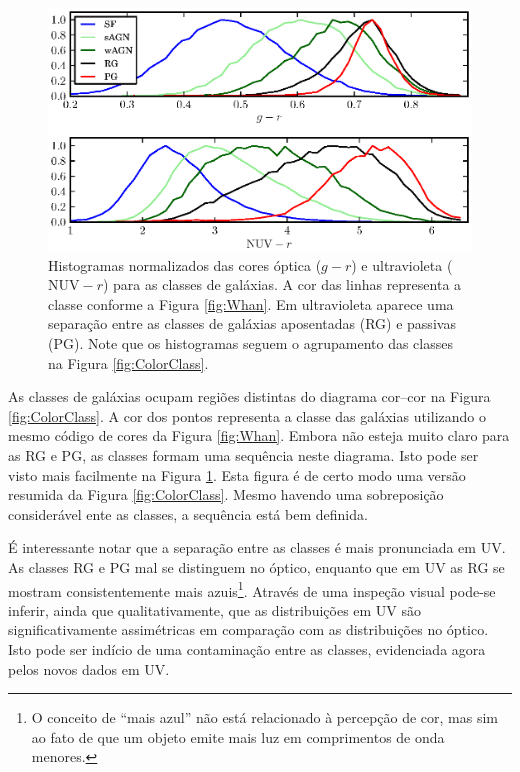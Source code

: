 \begin{figure}
	\includegraphics{figuras/histo_galtype_color.eps}
	\caption[Histogramas de cores para as classes de galáxias.]
	{Histogramas normalizados das cores óptica ($g-r$) e ultravioleta
	($\mathrm{NUV}-r$) para as classes de galáxias. A cor das linhas representa a
	classe conforme a Figura \ref{fig:Whan}. Em ultravioleta aparece uma separação
	entre as classes de galáxias aposentadas (RG) e passivas (PG). Note que os
	histogramas seguem o agrupamento das classes na Figura
	\ref{fig:ColorClass}.}
	\label{fig:HistogramaCorClasse}
\end{figure}

As classes de galáxias ocupam regiões distintas do diagrama cor--cor na Figura
\ref{fig:ColorClass}. A cor dos pontos representa a classe das galáxias
utilizando o mesmo código de cores da Figura \ref{fig:Whan}. Embora não esteja
muito claro para as RG e PG, as classes formam uma sequência neste diagrama.
Isto pode ser visto mais facilmente na Figura \ref{fig:HistogramaCorClasse}.
Esta figura é de certo modo uma versão resumida da Figura \ref{fig:ColorClass}.
Mesmo havendo uma sobreposição considerável ente as classes, a sequência está
bem definida.

É interessante notar que a separação entre as classes é mais pronunciada em UV.
As classes RG e PG mal se distinguem no óptico, enquanto que em UV as RG se
mostram consistentemente mais azuis\footnote{O conceito de ``mais azul'' não
está relacionado à percepção de cor, mas sim ao fato de que um objeto emite mais
luz em comprimentos de onda menores.}. Através de uma inspeção visual pode-se
inferir, ainda que qualitativamente, que as distribuições em UV são
significativamente assimétricas em comparação com as distribuições no óptico.
Isto pode ser indício de uma contaminação entre as classes, evidenciada agora
pelos novos dados em UV.

